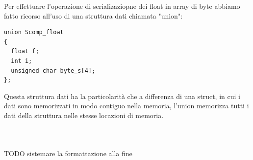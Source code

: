 \documentclass[10pt,a4paper]{article}
\begin{document}
Per effettuare l'operazione di serializaziopne dei float in array di byte abbiamo fatto ricorso all'uso di una struttura dati chiamata "union":
\begin{lstlisting}[style=myArduino, caption=union, captionpos=b]
union Scomp_float
{
  float f;
  int i;
  unsigned char byte_s[4];
};
\end{lstlisting}
Questa struttura dati ha la particolarit\`a che a differenza di una struct, in cui i dati sono memorizzati in modo contiguo nella memoria, l'union memorizza tutti i dati della struttura nelle stesse locazioni di memoria.
\\ \\ \\ \\ 

TODO sistemare la formattazione alla fine

\newsavebox{\mylistingboxstruct}
\newsavebox{\mylistingboxunion}

\newsavebox{\mytikzboxonestruct}
\newsavebox{\mytikzboxtwounion}
\end{document}
